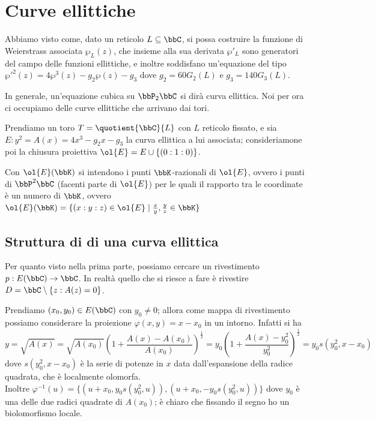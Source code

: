 \chapter{Curve ellittiche}

Abbiamo visto come, dato un reticolo $L \subseteq \bbC$, si possa costruire la funzione di Weierstrass associata $\wp_L (z)$, che insieme alla sua derivata $\wp'_L$ sono generatori del campo delle funzioni ellittiche, e inoltre soddisfano un'equazione del tipo $\wp'^2(z) = 4 \wp^3(z) - g_2 \wp(z) - g_3$ dove $g_2 = 60 G_2(L)$ e $g_3 = 140 G_3(L)$.

In generale, un'equazione cubica su $\bbP_2\bbC$ si dirà curva ellittica. Noi per ora ci occupiamo delle curve ellittiche che arrivano dai tori.

Prendiamo un toro $T=\quotient{\bbC}{L}$ con $L$ reticolo fissato, e sia $E: y^2 = A(x)=4x^3 - g_2 x - g_3$ la curva ellittica a lui associata; consideriamone poi la chiusura proiettiva $\ol{E} = E \cup \{ (0 : 1 : 0)\}$.

\begin{notazione}
  Con $\ol{E}(\bbK)$ si intendono i punti $\bbK$-razionali di $\ol{E}$, ovvero i punti di $\bbP^2 \bbC$ (facenti parte di $\ol{E}$) per le quali il rapporto tra le coordinate è un numero di $\bbK$, ovvero $\ol{E}(\bbK) = \{ (x : y : z) \in \ol{E} \mid \frac{x}{y}, \frac{y}{z} \in \bbK \}$
\end{notazione}

\section{Struttura di \sdR{} di una curva ellittica}

Per quanto visto nella prima parte, possiamo cercare un rivestimento $p: E(\bbC)\to\bbC$. In realtà quello che si riesce a fare è rivestire $D=\bbC\setminus\{z : A(z)=0\}$.

Prendiamo $(x_0,y_0)\in E(\bbC)$ con $y_0\neq0$; allora come mappa di rivestimento possiamo considerare la proiezione $\varphi(x,y)=x-x_0$ in un intorno. Infatti si ha $$ y=\sqrt{A(x)}=\sqrt{A(x_0)}\left(1+\frac{A(x)-A(x_0)}{A(x_0)} \right)^{\frac12} = y_0\left(1+\frac{A(x)-y_0^2}{y_0^2} \right)^{\frac12} = y_0s(y_0^2,x-x_0)$$
dove $s(y_0^2,x-x_0)$ è la serie di potenze in $x$ data dall'espansione della radice quadrata, che è localmente olomorfa.\\
Inoltre $\varphi^{-1}(u)=\{(u+x_0,y_0s(y_0^2,u)),(u+x_0,-y_0s(y_0^2,u))\}$ dove $y_0$ è una delle due radici quadrate di $A(x_0)$; è chiaro che fissando il segno ho un biolomorfismo locale.

